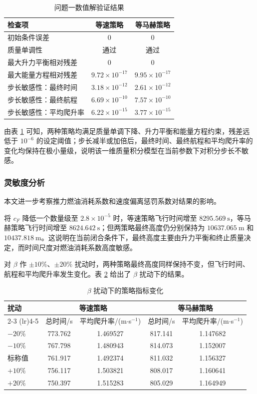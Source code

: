\documentclass[withoutpreface,bwprint]{cumcmthesis}
\begin{document}
\begin{table}[h]
\centering\caption{问题一数值解验证结果}\label{tab:validation}
\begin{tabular}{lcc}\toprule
检查项 & 等速策略 & 等马赫策略 \\
\midrule
初始条件误差 & $0$ & $0$ \\
质量单调性 & 通过 & 通过 \\
最大升力平衡相对残差 & $0$ & $0$ \\
最大能量方程相对残差 & $9.72\times 10^{-17}$ & $9.95\times 10^{-17}$ \\
步长敏感性：最终时间 & $3.18\times 10^{-12}$ & $2.61\times 10^{-12}$ \\
步长敏感性：最终航程 & $6.69\times 10^{-10}$ & $7.57\times 10^{-10}$ \\
步长敏感性：平均爬升率 & $6.22\times 10^{-15}$ & $3.77\times 10^{-15}$ \\
\bottomrule
\end{tabular}
\end{table}

由表 \ref{tab:validation} 可知，两种策略均满足质量单调下降、升力平衡和能量方程约束，残差远低于 $10^{-6}$ 的设定阈值；步长减半或加倍后，最终时间、最终航程和平均爬升率的变化均保持在极小量级，说明该一维质量积分模型在当前参数下对积分步长不敏感。

\subsubsection{灵敏度分析}

本文进一步考察推力燃油消耗系数和速度偏离惩罚系数对结果的影响。

将 $c_F$ 降低一个数量级至 $2.8\times 10^{-5}$ 时，等速策略飞行时间增至 $8295.569\ \mathrm{s}$，等马赫策略飞行时间增至 $8624.642\ \mathrm{s}$；但两策略最终高度仍分别保持为 $10637.065\ \mathrm{m}$ 和 $10437.818\ \mathrm{m}$。这说明在当前闭合条件下，最终高度主要由升力平衡和终止质量决定，而时间尺度对燃油消耗系数高度敏感。

对 $\beta$ 作 $\pm 10\%$、$\pm 20\%$ 扰动时，两种策略最终高度同样保持不变，但飞行时间、航程和平均爬升率发生变化。表 \ref{tab:sensitivity} 给出了 $\beta$ 扰动下的结果。

\begin{table}[h]
\centering\caption{$\beta$ 扰动下的策略指标变化}\label{tab:sensitivity}
\begin{tabular}{lcccc}\toprule
扰动 & \multicolumn{2}{c}{等速策略} & \multicolumn{2}{c}{等马赫策略} \\
\cmidrule(lr){2-3} \cmidrule(lr){4-5}
 & 总时间/s & 平均爬升率/(m$\cdot$s$^{-1}$) & 总时间/s & 平均爬升率/(m$\cdot$s$^{-1}$) \\
\midrule
$-20\%$ & 773.762 & 1.469527 & 817.141 & 1.147682 \\
$-10\%$ & 767.798 & 1.480943 & 814.073 & 1.152007 \\
标称值 & 761.917 & 1.492374 & 811.032 & 1.156327 \\
$+10\%$ & 756.117 & 1.503821 & 808.017 & 1.160641 \\
$+20\%$ & 750.397 & 1.515283 & 805.029 & 1.164949 \\
\bottomrule
\end{tabular}
\end{table}
\end{document}
